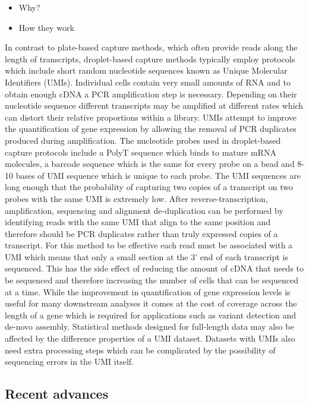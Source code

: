 \documentclass[11pt,a4paper,titlepage,twoside,openright]{style/unimelbthesis}
\theoremstyle{definition}
\theoremstyle{definition}
\theoremstyle{definition}
\theoremstyle{remark}
\begin{document}
\begin{mainmatter}
\begin{itemize}
\tightlist
\item
  Why?
\item
  How they work
\end{itemize}

In contrast to plate-based capture methods, which often provide reads along the length of transcripts, droplet-based capture methods typically employ protocols which include short random nucleotide sequences known as Unique Molecular Identifiers (UMIs). Individual cells contain very small amounts of RNA and to obtain enough cDNA a PCR amplification step is necessary. Depending on their nucleotide sequence different transcripts may be amplified at different rates which can distort their relative proportions within a library. UMIs attempt to improve the quantification of gene expression by allowing the removal of PCR duplicates produced during amplification. The nucleotide probes used in droplet-based capture protocols include a PolyT sequence which binds to mature mRNA molecules, a barcode sequence which is the same for every probe on a bead and 8-10 bases of UMI sequence which is unique to each probe. The UMI sequences are long enough that the probability of capturing two copies of a transcript on two probes with the same UMI is extremely low. After reverse-transcription, amplification, sequencing and alignment de-duplication can be performed by identifying reads with the same UMI that align to the same position and therefore should be PCR duplicates rather than truly expressed copies of a transcript. For this method to be effective each read must be associated with a UMI which means that only a small section at the 3' end of each transcript is sequenced. This has the side effect of reducing the amount of cDNA that needs to be sequenced and therefore increasing the number of cells that can be sequenced at a time. While the improvement in quantification of gene expression levels is useful for many downstream analyses it comes at the cost of coverage across the length of a gene which is required for applications such as variant detection and de-novo assembly. Statistical methods designed for full-length data may also be affected by the difference properties of a UMI dataset. Datasets with UMIs also need extra processing steps which can be complicated by the possibility of sequencing errors in the UMI itself.

\hypertarget{recent-advances}{%
\subsection{Recent advances}\label{recent-advances}}


\end{mainmatter}
\end{document}
